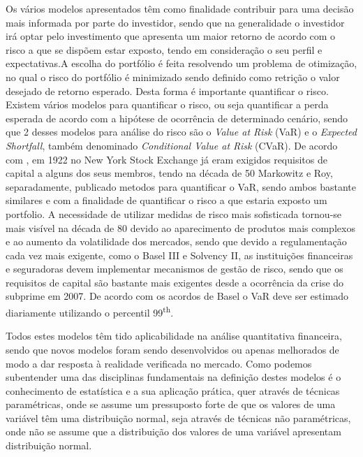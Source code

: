 \documentclass[
  12pt,
  brazil,
  a4paper,
  openany]{book}
\begin{document}
Os vários modelos apresentados têm como finalidade contribuir para uma decisão mais informada por parte do investidor, sendo que na generalidade o investidor irá optar pelo investimento que apresenta um maior retorno de acordo com o risco a que se dispõem estar exposto, tendo em consideração o seu perfil e expectativas.A escolha do portfólio é feita resolvendo um problema de otimização, no qual o risco do portfólio é minimizado sendo definido como retrição o valor desejado de retorno esperado. Desta forma é importante quantificar o risco. Existem vários modelos para quantificar o risco, ou seja quantificar a perda esperada de acordo com a hipótese de ocorrência de determinado cenário, sendo que 2 desses modelos para análise do risco são o \emph{Value at Risk} (VaR) e o \emph{Expected Shortfall}, também denominado \emph{Conditional Value at Risk} (CVaR). De acordo com \textcite{HistVaR}, em 1922 no New York Stock Exchange já eram exigidos requisitos de capital a alguns dos seus membros, tendo na década de 50 Markowitz e Roy, separadamente, publicado metodos para quantificar o VaR, sendo ambos bastante similares e com a finalidade de quantificar o risco a que estaria exposto um portfolio. A necessidade de utilizar medidas de risco mais sofisticada tornou-se mais visível na década de 80 devido ao aparecimento de produtos mais complexos e ao aumento da volatilidade dos mercados, sendo que devido a regulamentação cada vez mais exigente, como o Basel III e Solvency II, as instituições financeiras e seguradoras devem implementar mecanismos de gestão de risco, sendo que os requisitos de capital são bastante mais exigentes desde a ocorrência da crise do subprime em 2007. De acordo com os acordos de Basel o VaR deve ser estimado diariamente utilizando o percentil 99\textsuperscript{th}.

Todos estes modelos têm tido aplicabilidade na análise quantitativa financeira, sendo que novos modelos foram sendo desenvolvidos ou apenas melhorados de modo a dar resposta à realidade verificada no mercado. Como podemos subentender uma das disciplinas fundamentais na definição destes modelos é o conhecimento de estatística e a sua aplicação prática, quer através de técnicas paramétricas, onde se assume um pressuposto forte de que os valores de uma variável têm uma distribuição normal, seja através de técnicas não paramétricas, onde não se assume que a distribuição dos valores de uma variável apresentam distribuição normal.
\end{document}
